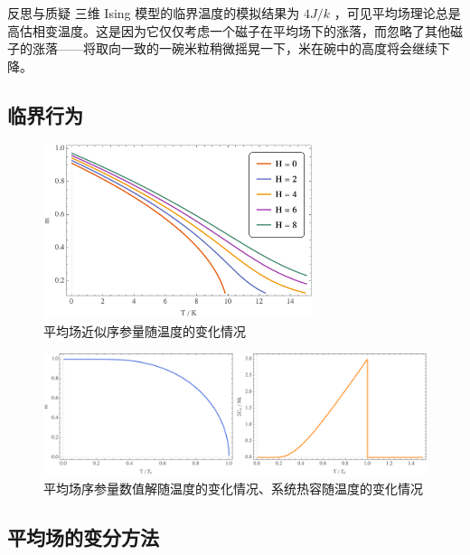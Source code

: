 \begin{justification}{\kaishu 反思与质疑}
\kaishu \fontsize{11pt}{16pt}
\quad\quad 三维 Ising 模型的临界温度的模拟结果为 $4J/k $ ，可见平均场理论总是高估相变温度。这是因为它仅仅考虑一个磁子在平均场下的涨落，而忽略了其他磁子的涨落——将取向一致的一碗米粒稍微摇晃一下，米在碗中的高度将会继续下降。
\end{justification}

\subsection{临界行为}\label{sub:临界行为}

\begin{figure}[ht]
    \centering
    \includegraphics[width=0.7\textwidth]{figures/one-dim-ising.png}
    \caption{\kaishu 平均场近似序参量随温度的变化情况}
    \label{fig:one-dim-ising}
\end{figure}

\begin{figure}[ht]
    \centering
    \includegraphics[width=1\textwidth]{figures/sol-capa.png}
    \caption{\kaishu 平均场序参量数值解随温度的变化情况、系统热容随温度的变化情况}
    \label{fig:sol-capa}
\end{figure}


\subsection{平均场的变分方法}\label{sub:平均场的变分方法}


